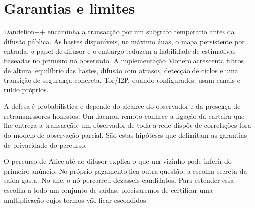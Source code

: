 \section{Garantias e limites}
\label{sec:dandelion-summary}

Dandelion++ encaminha a transacção por um subgrafo temporário antes da difusão
pública. As hastes disponíveis, no máximo duas, o mapa persistente por entrada,
o papel de difusor e o embargo reduzem a fiabilidade de estimativas baseadas no
primeiro nó observado.
A implementação Monero acrescenta filtros de altura, equilíbrio das hastes,
difusão com atrasos, detecção de ciclos e uma transição de segurança concreta.
Tor/I2P, quando configurados, usam canais e ruído próprios.

A defesa é probabilística e depende do alcance do observador e da
presença de retransmissores honestos. Um daemon remoto conhece a ligação
da carteira que lhe entrega a transacção; um observador de toda a rede
dispõe de correlações fora do modelo de observação parcial. São estas
hipóteses que delimitam as garantias de privacidade do percurso.

O percurso de Alice até ao difusor explica o que um vizinho pode inferir
do primeiro anúncio. No próprio pagamento fica outra questão, a escolha
secreta da saída gasta. No anel o nó percorreu dezasseis candidatos.
Para estender essa escolha a todo um conjunto de saídas, precisaremos
de certificar uma multiplicação cujos termos vão ficar escondidos.
\label{page:dandelion-end}
